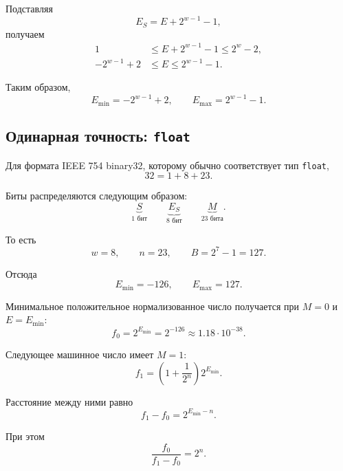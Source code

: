 \documentclass[../final.tex]{subfiles}
\begin{document}
Подставляя
%
\[
    E_S=E+2^{w-1}-1,
\]
%
получаем
%
\begin{align*}
    1
    &\leq
    E+2^{w-1}-1
    \leq
    2^w-2,
    \\[3pt]
    -2^{w-1}+2
    &\leq
    E
    \leq
    2^{w-1}-1.
\end{align*}

Таким образом,
%
\begin{equation*}
    E_{\min}
    =
    -2^{w-1}+2,
    \qquad
    E_{\max}
    =
    2^{w-1}-1.
\end{equation*}


\subsection{Одинарная точность: \texttt{float}}

Для формата IEEE 754 binary32, которому обычно соответствует
тип \texttt{float},
%
\[
    32
    =
    1+8+23.
\]

Биты распределяются следующим образом:
%
\[
    \underbrace{\boxed{S}}_{1\text{ бит}}
    \qquad
    \underbrace{\boxed{E_S}}_{8\text{ бит}}
    \qquad
    \underbrace{\boxed{M}}_{23\text{ бита}}.
\]

То есть
%
\[
    w=8,
    \qquad
    n=23,
    \qquad
    B=2^7-1=127.
\]

Отсюда
%
\begin{equation*}
    E_{\min}
    =
    -126,
    \qquad
    E_{\max}
    =
    127.
\end{equation*}

Минимальное положительное нормализованное число получается при
$M=0$ и $E=E_{\min}$:
%
\begin{equation*}
    f_0
    =
    2^{E_{\min}}
    =
    2^{-126}
    \approx
    1.18\cdot10^{-38}.
\end{equation*}


Следующее машинное число имеет $M=1$:
%
\begin{equation*}
    f_1
    =
    \left(
        1+\frac{1}{2^n}
    \right)
    2^{E_{\min}}.
\end{equation*}

Расстояние между ними равно
%
\begin{equation*}
    f_1-f_0
    =
    2^{E_{\min}-n}.
\end{equation*}

При этом
%
\begin{equation*}
    \frac{f_0}{f_1-f_0}
    =
    2^n.
\end{equation*}
\end{document}
